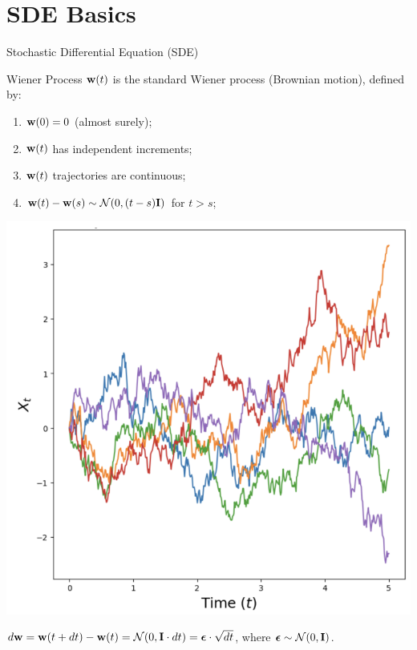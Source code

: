 \documentclass{beamer}
\begin{document}
\section{SDE Basics}
\begin{frame}{Stochastic Differential Equation (SDE)}
	\begin{block}{Wiener Process}
		$\mathbf{w}(t)$ is the standard Wiener process (Brownian motion), defined by:
		\vspace{-0.3cm}
		\begin{minipage}{0.5\columnwidth}
			\begin{enumerate}
				\item $\mathbf{w}(0) = 0$ (almost surely);
				\item $\mathbf{w}(t)$ has independent increments;
				\item $\mathbf{w}(t)$ trajectories are continuous;
				\item $\mathbf{w}(t) - \mathbf{w}(s) \sim \mathcal{N}(0, (t-s) \mathbf{I})$ for $t>s$;
			\end{enumerate}
		\end{minipage}%
		\begin{minipage}{0.45\columnwidth}
			\centering
			\includegraphics[width=\linewidth]{figs/brownian_motion}
		\end{minipage}
	\end{block}
	\eqpause
	$d\mathbf{w} = \mathbf{w}(t+dt) - \mathbf{w}(t) = \mathcal{N}(0, \mathbf{I} \cdot dt ) = \boldsymbol{\epsilon} \cdot \sqrt{dt}$, where $\boldsymbol{\epsilon} \sim \mathcal{N}(0, \mathbf{I})$.
\end{frame}
\end{document}
